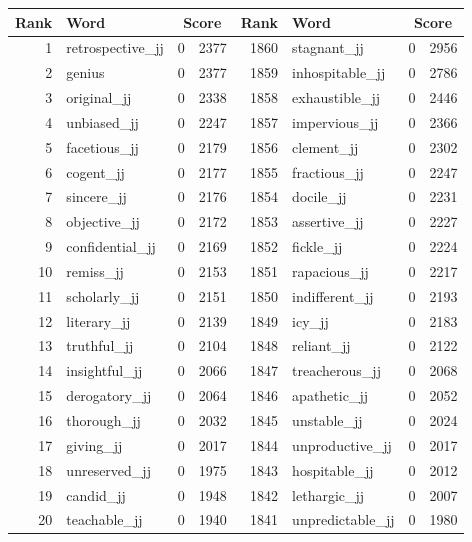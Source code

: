 \begin{table}[tbp]
    \begin{tabular}{| rlr@{.}l | rlr@{.}l |}
    \hline
    \textbf{Rank} & \textbf{Word} & \multicolumn{2}{c|}{\textbf{Score}} & \textbf{Rank} & \textbf{Word} & \multicolumn{2}{c|}{\textbf{Score}} \\
    \hline
    1 & retrospective\_jj & 0 & 2377    &    1860 & stagnant\_jj & 0 & 2956 \\
    2 & genius & 0 & 2377    &    1859 & inhospitable\_jj & 0 & 2786 \\
    3 & original\_jj & 0 & 2338    &    1858 & exhaustible\_jj & 0 & 2446 \\
    4 & unbiased\_jj & 0 & 2247    &    1857 & impervious\_jj & 0 & 2366 \\
    5 & facetious\_jj & 0 & 2179    &    1856 & clement\_jj & 0 & 2302 \\
    6 & cogent\_jj & 0 & 2177    &    1855 & fractious\_jj & 0 & 2247 \\
    7 & sincere\_jj & 0 & 2176    &    1854 & docile\_jj & 0 & 2231 \\
    8 & objective\_jj & 0 & 2172    &    1853 & assertive\_jj & 0 & 2227 \\
    9 & confidential\_jj & 0 & 2169    &    1852 & fickle\_jj & 0 & 2224 \\
    10 & remiss\_jj & 0 & 2153    &    1851 & rapacious\_jj & 0 & 2217 \\
    11 & scholarly\_jj & 0 & 2151    &    1850 & indifferent\_jj & 0 & 2193 \\
    12 & literary\_jj & 0 & 2139    &    1849 & icy\_jj & 0 & 2183 \\
    13 & truthful\_jj & 0 & 2104    &    1848 & reliant\_jj & 0 & 2122 \\
    14 & insightful\_jj & 0 & 2066    &    1847 & treacherous\_jj & 0 & 2068 \\
    15 & derogatory\_jj & 0 & 2064    &    1846 & apathetic\_jj & 0 & 2052 \\
    16 & thorough\_jj & 0 & 2032    &    1845 & unstable\_jj & 0 & 2024 \\
    17 & giving\_jj & 0 & 2017    &    1844 & unproductive\_jj & 0 & 2017 \\
    18 & unreserved\_jj & 0 & 1975    &    1843 & hospitable\_jj & 0 & 2012 \\
    19 & candid\_jj & 0 & 1948    &    1842 & lethargic\_jj & 0 & 2007 \\
    20 & teachable\_jj & 0 & 1940    &    1841 & unpredictable\_jj & 0 & 1980 \\

\end{tabular}
\end{table}
